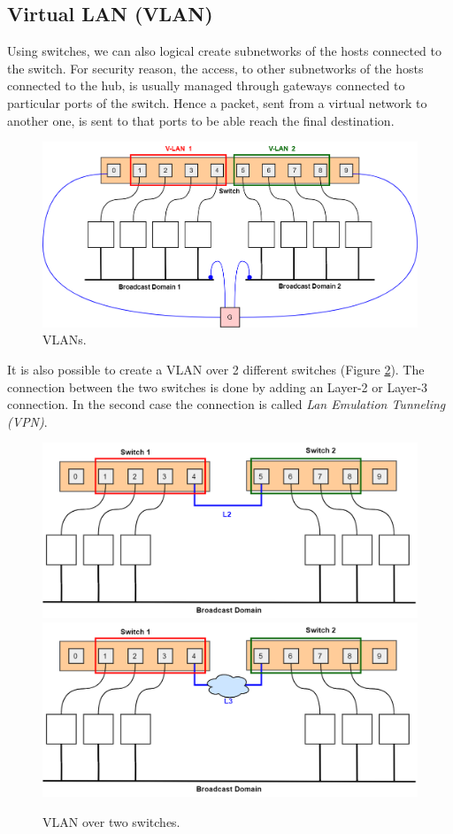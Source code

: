\subsection{Virtual LAN (VLAN)}
Using switches, we can also logical create subnetworks of the hosts connected to the switch. For security reason, the access, to other subnetworks of the hosts connected to the hub, is usually managed through gateways connected to particular ports of the switch. Hence a packet, sent from a virtual network to another one, is sent to that ports to be able reach the final destination.
\begin{figure}[H]
\centering
\includegraphics[scale=0.4]{Images/Layer2/vlan}
\caption{\footnotesize{VLANs.}}\label{vlan}
\end{figure}
It is also possible to create a VLAN over 2 different switches (Figure \ref{tunnel}). The connection between the two switches is done by adding an Layer-2 or Layer-3 connection. In the second case the connection is called \textit{Lan Emulation Tunneling (VPN)}.
\begin{figure}[H]
\centering
\includegraphics[scale=0.35]{Images/Layer2/tunnel_l2}
\includegraphics[scale=0.35]{Images/Layer2/tunnel_l3}
\caption{\footnotesize{VLAN over two switches.}}\label{tunnel}
\end{figure}

